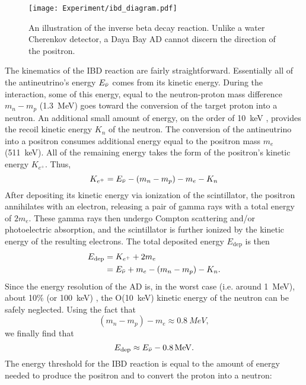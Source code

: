 \documentclass[../thesis.tex]{subfiles}
\begin{document}
\begin{figure}[ht]
  \texttt{[image: Experiment/ibd\_diagram.pdf]}
  \caption{An illustration of the inverse beta decay reaction. Unlike a water Cherenkov detector, a Daya Bay AD cannot discern the direction of the positron.}
  \label{fig:expIBD}
\end{figure}

The kinematics of the IBD reaction are fairly straightforward. Essentially all of the antineutrino's energy $E_{\bar\nu}$ comes from its kinetic energy. During the interaction, some of this energy, equal to the neutron-proton mass difference $m_n - m_p$ (1.3~MeV) goes toward the conversion of the target proton into a neutron. An additional small amount of energy, on the order of 10~keV \cite{An_2017}, provides the recoil kinetic energy $K_n$ of the neutron. The conversion of the antineutrino into a positron consumes additional energy equal to the positron mass $m_e$ (511~keV). All of the remaining energy takes the form of the positron's kinetic energy $K_{e^+}$. Thus,
\begin{equation}
  K_{e^+} = E_{\bar\nu} - (m_n - m_p) - m_e - K_n
\end{equation}
After depositing its kinetic energy via ionization of the scintillator, the positron annihilates with an electron, releasing a pair of gamma rays with a total energy of $2m_e$. These gamma rays then undergo Compton scattering and/or photoelectric absorption, and the scintillator is further ionized by the kinetic energy of the resulting electrons. The total deposited energy $E_{\mathrm{dep}}$ is then
\begin{align*}
  E_{\mathrm{dep}} &= K_{e^+} + 2m_e \\
             &= E_{\bar\nu} + m_e - (m_n - m_p) - K_n.
\end{align*}
Since the energy resolution of the AD is, in the worst case (i.e. around 1~MeV), about 10\% (or 100~keV) \cite{An_2017}, the O(10~keV) kinetic energy of the neutron can be safely neglected. Using the fact that
\begin{equation}
  (m_n - m_p) - m_e \approx \SI{0.8}{MeV},
\end{equation}
we finally find that
\begin{equation}
  \label{eq:enuToEdep}
  E_{\mathrm{dep}} \approx E_{\bar\nu} - \SI{0.8}{MeV}.
\end{equation}
The energy threshold for the IBD reaction is equal to the amount of energy needed to produce the positron and to convert the proton into a neutron:
\end{document}

